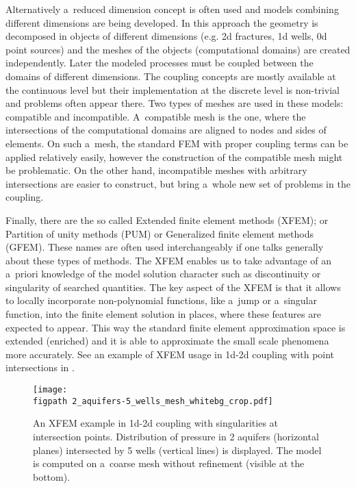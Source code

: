 Alternatively a~reduced dimension concept is often used and models combining different dimensions are being developed.
In this approach the geometry is decomposed in objects of different dimensions (e.g. 2d fractures, 1d wells, 0d point sources)
and the meshes of the objects (computational domains) are created independently.
Later the modeled processes must be coupled between the domains of different dimensions.
The coupling concepts are mostly available at the continuous level but their implementation
at the discrete level is non-trivial and problems often appear there.
Two types of meshes are used in these models: compatible and incompatible.
A~compatible mesh is the one, where the intersections of the computational domains are aligned to nodes and sides of elements.
On such a~mesh, the standard FEM with proper coupling terms can be applied relatively easily,
however the construction of the compatible mesh might be problematic.
On the other hand, incompatible meshes with arbitrary intersections are easier to construct, 
but bring a~whole new set of problems in the coupling.


Finally, there are the so called Extended finite element methods (XFEM); or Partition of unity methods (PUM) or Generalized
finite element methods (GFEM). These names are often used interchangeably if one talks generally about these types of methods. 
The XFEM enables us to take advantage of an a~priori knowledge of the model solution character
such as discontinuity or singularity of searched quantities.
The key aspect of the XFEM is that it allows to locally incorporate non-polynomial functions, like a~jump or a~singular function,
into the finite element solution in places, where these features are expected to appear.
This way the standard finite element approximation space is extended (enriched) and it is able to approximate the small scale phenomena
more accurately.
See an example of XFEM usage in 1d-2d coupling with point intersections in .
\begin{figure}[!htb]
  \centering    
    \texttt{[image: \\figpath 2\_aquifers-5\_wells\_mesh\_whitebg\_crop.pdf]}
  \caption[XFEM example for well-aquifer model with singularities.]
        { An XFEM example in 1d-2d coupling with singularities at intersection points.
            Distribution of pressure in 2 aquifers (horizontal planes) intersected by 5 wells 
            (vertical lines) is displayed. The model is computed on a~coarse mesh without refinement (visible at the bottom). }
  \label{fig:aquifers}
\end{figure}

